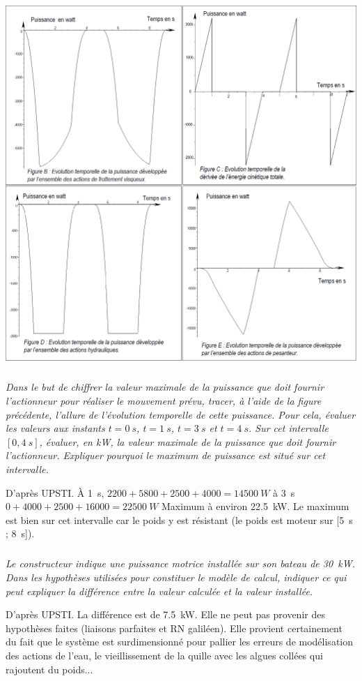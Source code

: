 \documentclass[10pt,fleqn]{article} %
\begin{document}
\begin{multicols}{2}
\begin{multicols}{2}
\begin{center}
\includegraphics[width=.8\linewidth]{images/fig_07}
\end{center}

\fi

\subparagraph{}\textit{Dans le but de chiffrer la valeur maximale de la puissance que doit fournir l’actionneur pour réaliser
le mouvement prévu, tracer, à l’aide de la figure précédente, l’allure de
l’évolution temporelle de cette puissance. Pour cela, évaluer les valeurs aux instants $t=\SI{0}{s}$, $t=\SI{1}{s}$,
$t=\SI{3}{s}$ et $t=\SI{4}{s}$.
Sur cet intervalle $[0,\SI{4}{s}]$, évaluer, en kW, la valeur maximale de la puissance que doit fournir
l’actionneur. Expliquer pourquoi le maximum de puissance est situé sur cet intervalle.}
\ifprof
\begin{corrige}
D'après UPSTI. À \SI{1}{s}, $2200+5800+2500+4000=\SI{14500}{W}$ à \SI{3}{s}
$0+4000+2500+16000=\SI{22500}{W}$
Maximum à environ \SI{22,5}{kW}.
Le maximum est bien sur cet intervalle car le poids y est résistant (le poids est moteur sur
[\SI{5}{s} ; \SI{8}{s}]).

\end{corrige}
\else
\fi
\subparagraph{}\textit{
Le constructeur indique une puissance motrice installée sur son bateau de \SI{30}{kW}.
Dans les hypothèses utilisées pour constituer le modèle de calcul, indiquer ce qui peut expliquer la
différence entre la valeur calculée et la valeur installée.}
\ifprof
\begin{corrige}
D'après UPSTI. La différence est de \SI{7,5}{kW}.
Elle ne peut pas provenir des hypothèses faites (liaisons parfaites et RN galiléen).
Elle provient certainement du fait que le système est surdimensionné
pour pallier les erreurs de modélisation des actions de l'eau, le vieillissement de la quille avec
les algues collées qui rajoutent du poids...
\end{corrige}
\else
\fi


\ifprof
\end{multicols}
\else
\end{multicols}
\fi
\end{document}

